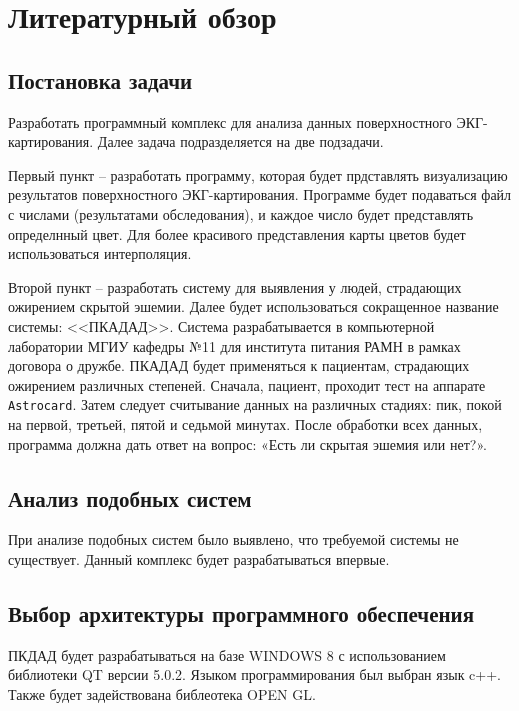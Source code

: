 \section{Литературный обзор}
\subsection{Постановка задачи}
   Разработать программный комплекс для анализа данных поверхностного ЭКГ-картирования. Далее задача подразделяется на две подзадачи.

Первый пункт -- разработать программу, которая будет прдставлять визуализацию результатов поверхностного ЭКГ-картирования.
Программе будет подаваться файл с числами (результатами обследования), и каждое число будет представлять определнный цвет. 
Для более красивого представления карты цветов будет использоваться интерполяция.

Второй пункт -- разработать систему для выявления у людей, страдающих ожирением скрытой эшемии.
Далее будет использоваться сокращенное название системы: <<ПКАДАД>>.
Система разрабатывается в компьютерной лаборатории МГИУ кафедры №11 для института питания РАМН в рамках договора о дружбе.
ПКАДАД будет применяться к пациентам, страдающих ожирением различных степеней.
Сначала, пациент, проходит тест на аппарате \verb|Astrocard|.
Затем следует считывание данных на различных стадиях: пик, покой на первой, третьей, пятой и седьмой минутах.
После обработки всех данных, программа должна дать ответ на вопрос: «Есть ли скрытая эшемия или нет?».


\subsection{Анализ подобных систем}
При анализе подобных систем было выявлено, что требуемой системы не существует.
Данный комплекс будет разрабатываться впервые.

\subsection{Выбор архитектуры программного обеспечения}
ПКДАД будет разрабатываться на базе WINDOWS 8 с использованием библиотеки QT версии 5.0.2.
Языком программирования был выбран язык c++. Также будет задействована библеотека OPEN GL.


